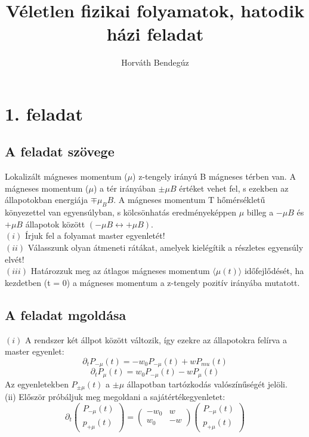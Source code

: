 \documentclass[12pt]{article}
\title{Véletlen fizikai folyamatok, hatodik házi feladat}
\author{Horváth Bendegúz}
\begin{document}
\maketitle
\section*{1. feladat}
\subsection*{A feladat szövege}
Lokalizált mágneses momentum ($\mu$) z-tengely irányú B mágneses térben van. A mágneses
momentum ($\mu$) a tér irányában $\pm\mu B$ értéket vehet fel, s ezekben az állapotokban energiája $ \mp\mu_BB$. A mágneses momentum T hőmérsékletű könyezettel van egyensúlyban, s kölcsönhatás eredményeképpen $\mu$ billeg a $-\mu B$ és $+\mu B$ állapotok között $ (-\mu B \leftrightarrow  +\mu B)$.\\
$(i)$ Írjuk fel a folyamat master egyenletét!\\
$(ii)$ Válasszunk olyan átmeneti rátákat, amelyek kielégítik a részletes egyensúly elvét!\\
$(iii)$ Határozzuk meg az átlagos mágneses momentum $\langle \mu (t)\rangle$ időfejlődését, ha kezdetben (t = 0) a mágneses momentum a z-tengely pozitív irányába mutatott.
\subsection*{A feladat mgoldása}
$(i)$ A rendszer két állpot között változik, így ezekre az állapotokra felírva a master egyenlet:
$$\partial _tP_{-\mu}(t) = -w_0P_{-\mu}(t) + wP_{mu}(t)$$
$$\partial_t P_{\mu}(t)= w_0P_{-\mu}(t) - w P_{\mu}(t)$$
Az egyenletekben $P_{\pm\mu}(t)$ a $\pm\mu$ állapotban tartózkodás valószínűségét jelöli. \\
(ii) Először próbáljuk meg megoldani a sajátértékegyenletet:
\[
\partial_t
\begin{pmatrix}
P_{-\mu}(t)\\
p_{+\mu}(t)
\end{pmatrix}=
\begin{pmatrix}
-w_0& w\\
w_0 & -w
\end{pmatrix}
\begin{pmatrix}
P_{-\mu}(t)\\
p_{+\mu}(t)
\end{pmatrix}
\]
\end{document}
